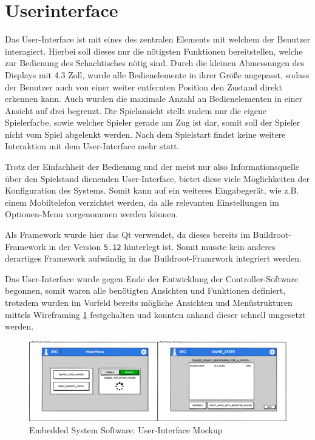 \hypertarget{userinterface}{%
\section{Userinterface}\label{userinterface}}

Das User-Interface ist mit eines des zentralen Elements mit welchem der
Benutzer interagiert. Hierbei soll dieses nur die nötigsten Funktionen
bereitstellen, welche zur Bedienung des Schachtisches nötig sind. Durch
die kleinen Abmessungen des Displays mit 4.3 Zoll, wurde alle
Bedienelemente in ihrer Größe angepasst, sodass der Benutzer auch von
einer weiter entfernten Position den Zustand direkt erkennen kann. Auch
wurden die maximale Anzahl an Bedienelementen in einer Ansicht auf drei
begrenzt. Die Spielansicht stellt zudem nur die eigene Spielerfarbe,
sowie welcher Spieler gerade am Zug ist dar, somit soll der Spieler
nicht vom Spiel abgelenkt werden. Nach dem Spielstart findet keine
weitere Interaktion mit dem User-Interface mehr statt.

Trotz der Einfachheit der Bedienung und der meist nur also
Informationsquelle über den Spielstand dienenden User-Interface, bietet
diese viele Möglichkeiten der Konfiguration des Systems. Somit kann auf
ein weiteres Eingabegerät, wie z.B. einem Mobiltelefon verzichtet
werden, da alle relevanten Einstellungen im Optionen-Menu vorgenommen
werden können.

Als Framework wurde hier das Qt\cite{qtframework} verwendet, da
dieses bereits im Buildroot-Framework in der Version
\passthrough{\lstinline!5.12!} hinterlegt ist. Somit musste kein anderes
derartiges Framework aufwändig in das Buildroot-Framrwork integriert
werden.

Das User-Interface wurde gegen Ende der Entwicklung der
Controller-Software begonnen, somit waren alle benötigten Ansichten und
Funktionen definiert, trotzdem wurden im Vorfeld bereits mögliche
Ansichten und Menüstrukturen mittels Wireframing \ref{ATC_Gui}
festgehalten und konnten anhand dieser schnell umgesetzt werden.

\begin{figure}
\centering
\includegraphics{images/ATC_Gui.png}
\caption{Embedded System Software: User-Interface Mockup
\label{ATC_Gui}}
\end{figure}

